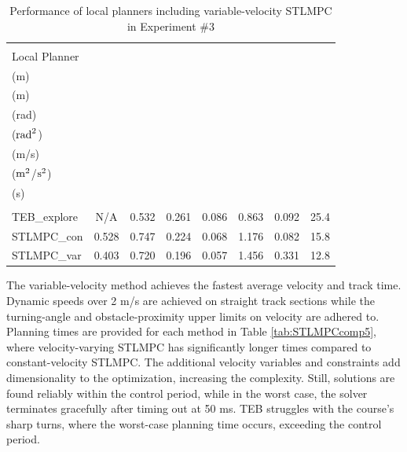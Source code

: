 \documentclass[journal]{IEEEtran}
\begin{document}
\begin{table}[ht]
  \caption{Performance of local planners including variable-velocity STLMPC in Experiment \#3}
  \label{tab:STLMPCexp5}
  \vspace{-8pt}
  \centering
  \begin{tabular}{l@{\hskip 0.4pt}c@{\hskip 2pt}c@{\hskip 2pt}c@{\hskip 2pt}c@{\hskip 2pt}c@{\hskip 2pt}c@{\hskip 1pt}c}
    \toprule\\[-0.85em]
    \scriptsize Local Planner & \makecell{\scriptsize$\min_{\tilde k} d_{\textup{min},\tilde k}$\\[0.25em](m)} & \makecell{\scriptsize$\bar{d}_\textup{min}$\\[0.3em](m)} & \makecell{\scriptsize$\overline{|\delta_{\textup{cmd},\tilde k}|}$\\[0.2em](rad)} & \makecell{\scriptsize$\mathrm{Var}(\delta_{\textup{cmd},\tilde k})$\\[0.2em]($\textup{rad}^2$)} & \makecell{\scriptsize$\bar{v}_{\textup{cmd},\tilde k}$\\[0.3em](m/s)} & \makecell{\scriptsize$\mathrm{Var}(v_{\textup{cmd},\tilde k})$\\[0.2em]($\textup{m}^2$/$\textup{s}^2$)} & \makecell{\scriptsize$t_\textup{tot}$\\[0.35em](s)}\\
    \midrule\\[-0.85em]
    \scriptsize TEB\_explore      & N/A & 0.532 & 0.261 & 0.086 & 0.863 & 0.092 & 25.4 \\
    \scriptsize STLMPC\_con     & 0.528 & 0.747 & 0.224 & 0.068 & 1.176 & 0.082 & 15.8  \\
    \scriptsize STLMPC\_var   & 0.403 & 0.720 & 0.196 & 0.057 & 1.456 & 0.331 & 12.8  \\
    \bottomrule
  \end{tabular}
\end{table}

The variable-velocity method achieves the fastest average velocity and track time. Dynamic speeds over 2 m/s are achieved on straight track sections while the turning-angle and obstacle-proximity upper limits on velocity are adhered to. Planning times are provided for each method in Table \ref{tab:STLMPCcomp5}, where velocity-varying STLMPC has significantly longer times compared to constant-velocity STLMPC. The additional velocity variables and constraints add dimensionality to the optimization, increasing the complexity. Still, solutions are found reliably within the control period, while in the worst case, the solver terminates gracefully after timing out at 50 ms. TEB struggles with the course's sharp turns, where the worst-case planning time occurs, exceeding the control period.
\end{document}

